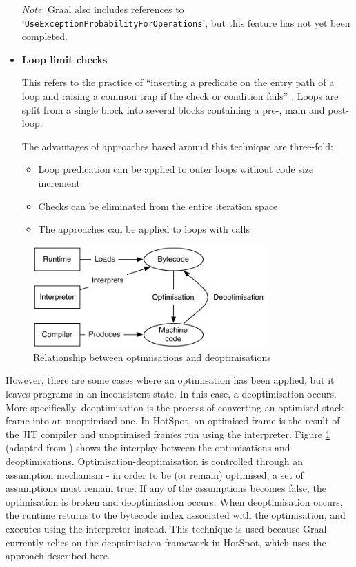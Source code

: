 \begin{itemize}
		{\small\textit{Note}: Graal also includes references to `\texttt{UseExceptionProbabilityForOperations}', but this feature has not yet been completed.}
	
	\item \textbf{Loop limit checks}
	
		This refers to the practice of ``inserting a predicate on the entry path of a loop and raising a common trap if the check or condition fails'' \citep{LoopPrediction}. Loops are split from a single block into several blocks containing a pre-, main and post- loop.
		
		The advantages of approaches based around this technique are three-fold:
		
		\begin{itemize}
			\item Loop predication can be applied to outer loops without code size increment
			
			\item Checks can be eliminated from the entire iteration space
			
			\item The approaches can be applied to loops with calls
		\end{itemize}
\end{itemize}

\begin{figure}
	\centering
	\includegraphics[width=0.8\textwidth]{graphics/jvminternals.pdf}
	\caption{Relationship between optimisations and deoptimisations}
	\label{fig:jvm-internals}
\end{figure}

However, there are some cases where an optimisation has been applied, but it leaves programs in an inconsistent state. In this case, a deoptimisation occurs. More specifically, deoptimisation \citep{Holzle1992} is the process of converting an optimised stack frame into an unoptimised one. In HotSpot, an optimised frame is the result of the JIT compiler and unoptimised frames run using the interpreter. Figure \ref{fig:jvm-internals} (adapted from \citet[p.~24]{Schwaighofer2009}) shows the interplay between the optimisations and deoptimisations. Optimisation-deoptimisation is controlled through an assumption mechanism - in order to be (or remain) optimised, a set of assumptions must remain true. If any of the assumptions becomes false, the optimisation is broken and deoptimiastion occurs. When deoptimisation occurs, the runtime returns to the bytecode index associated with the optimisation, and executes using the interpreter instead. This technique is used because Graal currently relies on the deoptimisaton framework in HotSpot\texttrademark, which uses the approach described here. 


